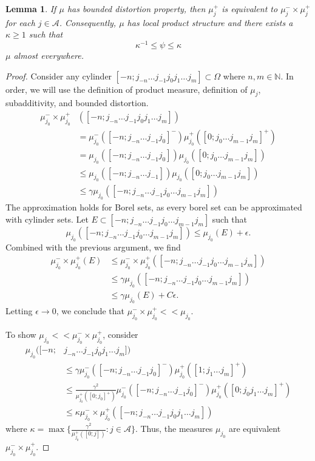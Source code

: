 \documentclass{amsart}
\newtheorem{lemma}{Lemma}
\newcommand{\NN}{\mathbb{N}}
\newcommand{\A}{\mathcal{A}}
\begin{document}
\begin{lemma}\label{l.BDLP_LRNbound}
    If $\mu$ has bounded distortion property, then $\mu^+_j$ is equivalent to $\mu^-_j\times\mu^+_j$ for each $j\in \A$. Consequently, $\mu$ has local product structure and there exists a $\kappa\geq 1$ such that
    \[\kappa^{-1}\leq \psi \leq \kappa\]
    $\mu$ almost everywhere.
\end{lemma}
\begin{proof}
    Consider any cylinder $[-n; j_{-n}\dots j_{-1}j_0j_1\dots j_m]\subset \Omega$ where $n,m\in \NN$. In order, we will use the definition of product measure, definition of $\mu_j$, subadditivity, and bounded distortion.
    \begin{align}
        \mu_{j_0}^-\times\mu_{j_0}^+&([-n; j_{-n}\dots j_{-1}j_0j_1\dots j_m]) \label{e.test1}\\
        &= \mu_{j_0}^-([-n; j_{-n}\dots j_{-1}j_0]^-) \mu_{j_0}^+([0; j_{0}\dots j_{m-1}j_m]^+) \nonumber\\
        &= \mu_{j_0}([-n; j_{-n}\dots j_{-1}j_0]) \mu_{j_0}([0; j_{0}\dots j_{m-1}j_m])\nonumber\\
        &\leq \mu_{j_0}([-n; j_{-n}\dots j_{-1}]) \mu_{j_0}([0; j_{0}\dots j_{m-1}j_m])\nonumber\\
        &\leq \gamma \mu_{j_0}([-n; j_{-n}\dots j_{-1}j_{0}\dots j_{m-1}j_m])\nonumber
    \end{align}
    The approximation holds for Borel sets, as every borel set can be approximated with cylinder sets. Let $E\subset [-n; j_{-n}\dots j_{-1}j_{0}\dots j_{m-1}j_m]$ such that
    \[\mu_{j_0}([-n; j_{-n}\dots j_{-1}j_{0}\dots j_{m-1}j_m])\leq \mu_{j_0}(E) + \epsilon.\]
    Combined with the previous argument, we find
    \begin{align}
        \mu_{j_0}^-\times\mu_{j_0}^+(E) &\leq \mu_{j_0}^-\times\mu_{j_0}^+([-n; j_{-n}\dots j_{-1}j_{0}\dots j_{m-1}j_m]) \nonumber\\
        &\leq \gamma\mu_{j_0}([-n; j_{-n}\dots j_{-1}j_{0}\dots j_{m-1}j_m]) \nonumber\\
        &\leq \gamma\mu_{j_0}(E) + C\epsilon. \nonumber
    \end{align}
    Letting $\epsilon \rightarrow 0$, we conclude that $\mu_{j_0}^-\times\mu_{j_0}^+ << \mu_{j_0}$. 

    To show $\mu_{j_0} << \mu_{j_0}^-\times\mu_{j_0}^+$, consider
    \begin{align}
        \mu_{j_0}([-n;& j_{-n}\dots j_{-1}j_0j_1\dots j_m]) \label{e.test2}\\
        &\leq \gamma \mu_{j_0}^-([-n; j_{-n}\dots j_{-1}j_0]^-)\mu^+_{j_0}([1;j_1\dots j_m]^+) \nonumber\\
        &\leq \frac{\gamma^2}{\mu^+_{j_0}([0;j_0]^+)}\mu_{j_0}^-([-n; j_{-n}\dots j_{-1}j_0]^-)\mu^+_{j_0}([0;j_0j_1\dots j_m]^+) \nonumber\\
        &\leq \kappa \mu_{j_0}^-\times\mu_{j_0}^+([-n; j_{-n}\dots j_{-1}j_0j_1\dots j_m])\nonumber
    \end{align}
    where $\kappa = \max\{\frac{\gamma^2}{\mu^+_{j_0}([0;j])}: j\in \A\}$. Thus, the measures $\mu_{j_0}$ are equivalent $\mu_{j_0}^-\times\mu_{j_0}^+$.
    

\end{proof}
\end{document}
